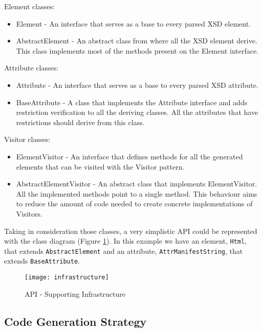 Element classes:

\begin{itemize}  
	\item Element - An interface that serves as a base to every parsed \ac{XSD} element.
	\item AbstractElement - An abstract class from where all the \ac{XSD} element derive. This class implements most of the methods present on the Element interface.
\end{itemize}

Attribute classes:

\begin{itemize}  
	\item Attribute - An interface that serves as a base to every parsed \ac{XSD} attribute.
	\item BaseAttribute - A class that implements the Attribute interface and adds restriction verification to all the deriving classes. All the attributes that have restrictions should derive from this class.
\end{itemize}

Visitor classes:

\begin{itemize}
	\item ElementVisitor - An interface that defines methods for all the generated elements that can be visited with the Visitor pattern. 
	\item AbstractElementVisitor - An abstract class that implements ElementVisitor. All the implemented methods point to a single method. This behaviour aims to reduce the amount of code needed to create concrete implementations of  Visitors.
\end{itemize}

\noindent
Taking in consideration those classes, a very simplistic \ac{API} could be represented with the class diagram (Figure \ref{img:infrastructure}). In this example we have an element, \texttt{Html}, that extends \texttt{AbstractElement} and an attribute, \texttt{AttrManifestString}, that extends \texttt{BaseAttribute}. 

\begin{figure}[H]
	\centering
	\texttt{[image: infrastructure]}
	\caption{API - Supporting Infrastructure}
	\label{img:infrastructure}
\end{figure}

\subsection{Code Generation Strategy}
\label{sec:codegenerationstrategy}

